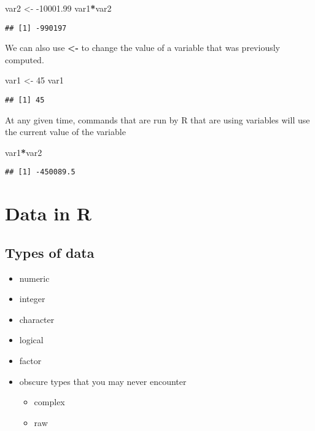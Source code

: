 \documentclass[]{book}
\newenvironment{Shaded}{\begin{snugshade}}{\end{snugshade}}
\newcommand{\DecValTok}[1]{\textcolor[rgb]{0.00,0.00,0.81}{#1}}
\newcommand{\FloatTok}[1]{\textcolor[rgb]{0.00,0.00,0.81}{#1}}
\newcommand{\NormalTok}[1]{#1}
\newcommand{\OperatorTok}[1]{\textcolor[rgb]{0.81,0.36,0.00}{\textbf{#1}}}
\newcommand{\StringTok}[1]{\textcolor[rgb]{0.31,0.60,0.02}{#1}}
\providecommand{\tightlist}{%
  \setlength{\itemsep}{0pt}\setlength{\parskip}{0pt}}
\begin{document}
\begin{Shaded}
\begin{Highlighting}[]
\NormalTok{var2 <-}\StringTok{ }\FloatTok{-10001.99}
\NormalTok{var1}\OperatorTok{*}\NormalTok{var2}
\end{Highlighting}
\end{Shaded}

\begin{verbatim}
## [1] -990197
\end{verbatim}

We can also use \textbf{\textless{}-} to change the value of a variable that was previously computed.

\begin{Shaded}
\begin{Highlighting}[]
\NormalTok{var1 <-}\StringTok{ }\DecValTok{45}
\NormalTok{var1}
\end{Highlighting}
\end{Shaded}

\begin{verbatim}
## [1] 45
\end{verbatim}

At any given time, commands that are run by R that are using variables will use the current value of the variable

\begin{Shaded}
\begin{Highlighting}[]
\NormalTok{var1}\OperatorTok{*}\NormalTok{var2}
\end{Highlighting}
\end{Shaded}

\begin{verbatim}
## [1] -450089.5
\end{verbatim}

\hypertarget{data1}{%
\chapter{Data in R}\label{data1}}

\hypertarget{datatypes}{%
\section*{Types of data}\label{datatypes}}

\begin{itemize}
\tightlist
\item
  numeric
\item
  integer
\item
  character
\item
  logical
\item
  factor
\item
  obscure types that you may never encounter

  \begin{itemize}
  \tightlist
  \item
    complex
  \item
    raw
  \end{itemize}
\end{itemize}
\end{document}
